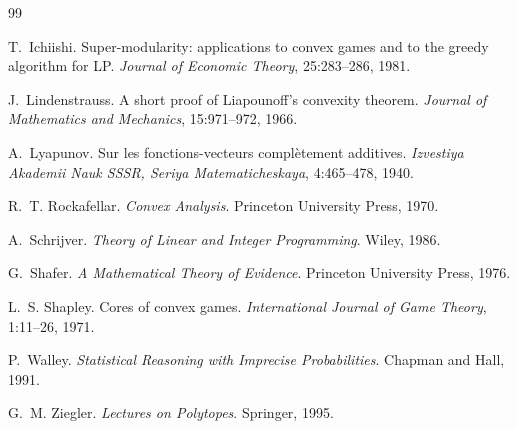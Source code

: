 \documentclass[11pt]{article}
\theoremstyle{plain}
\theoremstyle{definition}
\theoremstyle{remark}
\begin{document}
\begin{thebibliography}{99}

T.~Ichiishi.
\newblock Super-modularity: applications to convex games and to the greedy algorithm
for {LP}.
\newblock \emph{Journal of Economic Theory}, 25:283--286, 1981.

J.~Lindenstrauss.
\newblock A short proof of {L}iapounoff's convexity theorem.
\newblock \emph{Journal of Mathematics and Mechanics}, 15:971--972, 1966.

A.~Lyapunov.
\newblock Sur les fonctions-vecteurs compl\`etement additives.
\newblock \emph{Izvestiya Akademii Nauk SSSR, Seriya Matematicheskaya}, 4:465--478,
1940.

R.~T. Rockafellar.
\newblock \emph{Convex Analysis}.
\newblock Princeton University Press, 1970.

A.~Schrijver.
\newblock \emph{Theory of Linear and Integer Programming}.
\newblock Wiley, 1986.

G.~Shafer.
\newblock \emph{A Mathematical Theory of Evidence}.
\newblock Princeton University Press, 1976.

L.~S. Shapley.
\newblock Cores of convex games.
\newblock \emph{International Journal of Game Theory}, 1:11--26, 1971.

P.~Walley.
\newblock \emph{Statistical Reasoning with Imprecise Probabilities}.
\newblock Chapman and Hall, 1991.

G.~M. Ziegler.
\newblock \emph{Lectures on Polytopes}.
\newblock Springer, 1995.

\end{thebibliography}
\end{document}
